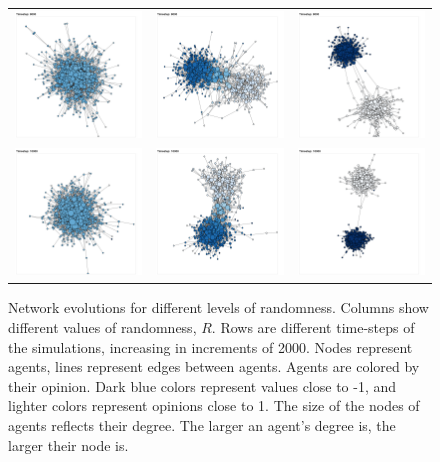 \documentclass{article}
\begin{document}
\begin{center}
\begin{figure}[H]
\begin{tabular}{ccc}
    \includegraphics[width=.2\linewidth]{../plots/networks/network_example_R0.1_8000.png} & \includegraphics[width=.2\linewidth]{../plots/networks/network_example_R0.3_8000.png} & \includegraphics[width=.2\linewidth]{../plots/networks/network_example_R0.5_8000.png}\\  
    \includegraphics[width=.2\linewidth]{../plots/networks/network_example_R0.1_10000.png} & \includegraphics[width=.2\linewidth]{../plots/networks/network_example_R0.3_10000.png} & \includegraphics[width=.2\linewidth]{../plots/networks/network_example_R0.5_10000.png}\\  
    \end{tabular} 
    \caption{Network evolutions for different levels of randomness. Columns show different values of randomness, $R$. Rows are different time-steps of the simulations, increasing in increments of 2000. Nodes represent agents, lines represent edges between agents. Agents are colored by their opinion. Dark blue colors represent values close to -1, and lighter colors represent opinions close to 1. The size of the nodes of agents reflects their degree. The larger an agent's degree is, the larger their node is.} 
    \label{fig:networks} 
    \end{figure} 
\end{center} 
\end{document}
